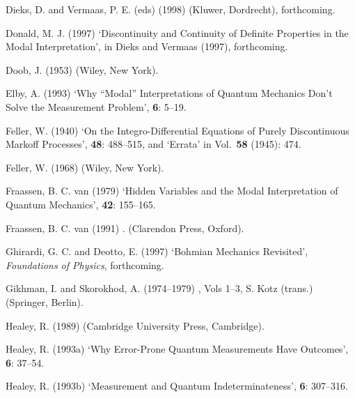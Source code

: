 \documentclass[12pt]{article}
\begin{document}
\begin{thebibliography}{10}
Dieks, D. and Vermaas, P. E. (eds) (1998)
 (Kluwer,
Dordrecht), forthcoming.

Donald, M. J. (1997)
\newblock `Discontinuity and Continuity of
Definite Properties in the Modal Interpretation',
\newblock in Dieks and Vermaas (1997), forthcoming.

Doob, J. (1953)
 (Wiley, New York).

Elby, A.  (1993)
\newblock `Why ``Modal'' Interpretations of Quantum Mechanics Don't Solve
the Measurement Problem',
 {\bf 6}: 5--19.

Feller, W.  (1940)
\newblock `On the Integro-Differential Equations of Purely
Discontinuous Markoff Processes',
 {\bf
48}: 488--515, and `Errata' in Vol.~{\bf 58} (1945): 474.

Feller, W. (1968)
(Wiley, New York).

Fraassen, B. C. van (1979)
\newblock `Hidden Variables and the Modal Interpretation of Quantum
Mechanics',
 {\bf 42}: 155--165.

Fraassen, B. C. van (1991)
.
\newblock (Clarendon Press, Oxford).

Ghirardi, G. C. and Deotto, E. (1997)
\newblock `Bohmian Mechanics Revisited',
{\em Foundations of Physics}, forthcoming.

Gikhman, I. and Skorokhod, A. (1974--1979)
, Vols 1--3,
\newblock S. Kotz (trans.) (Springer, Berlin).

Healey, R.  (1989)
\newblock (Cambridge University Press, Cambridge).

Healey, R. (1993a)
\newblock `Why Error-Prone Quantum Measurements Have Outcomes',
 {\bf 6}: 37--54.

Healey, R. (1993b)
\newblock `Measurement and Quantum Indeterminateness',
 {\bf 6}: 307--316.


\end{thebibliography}
\end{document}
